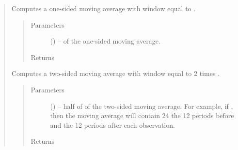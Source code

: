 \documentclass[letterpaper,10pt,openany,oneside,english]{sphinxmanual}
\begin{document}
\begin{fulllineitems}
\begin{quote}
\begin{fulllineitems}
\begin{quote}
\begin{description}
\end{description}\end{quote}

\end{fulllineitems}


\begin{fulllineitems}
\label{\detokenize{series_class:fredpy.series.ma1side}}
Computes a one-sided moving average with window equal to .
\begin{quote}\begin{description}
\item[{Parameters}] \leavevmode
{} (\href{https://docs.python.org/2/library/functions.html\#int}{}) --  of the one-sided moving average.

\item[{Returns}] \leavevmode
{\hyperref[\detokenize{series_class:fredpy.series}]{}}

\end{description}\end{quote}

\end{fulllineitems}


\begin{fulllineitems}
\label{\detokenize{series_class:fredpy.series.ma2side}}
Computes a two-sided moving average with window equal to 2 times .
\begin{quote}\begin{description}
\item[{Parameters}] \leavevmode
{} (\href{https://docs.python.org/2/library/functions.html\#int}{}) -- half of  of the two-sided moving average. For example, if , then the moving average will contain 24 the 12 periods before and the 12 periods after each observation.

\item[{Returns}] \leavevmode
{\hyperref[\detokenize{series_class:fredpy.series}]{}}


\end{description}
\end{quote}
\end{fulllineitems}
\end{quote}
\end{fulllineitems}
\end{document}
